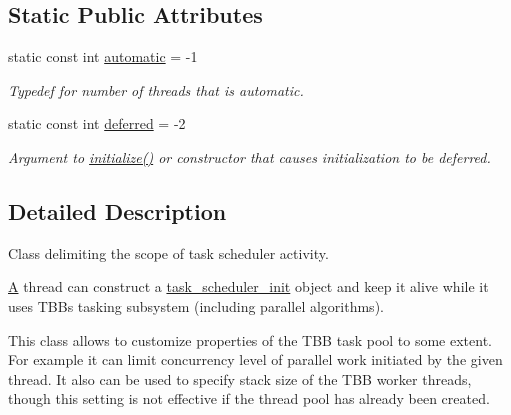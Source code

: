 \subsection*{Static Public Attributes}
\begin{DoxyCompactItemize}
\item 
\hypertarget{classtbb_1_1task__scheduler__init_a945886f5ef48300a8ebff2d077c166b1}{}static const int \hyperlink{classtbb_1_1task__scheduler__init_a945886f5ef48300a8ebff2d077c166b1}{automatic} = -\/1\label{classtbb_1_1task__scheduler__init_a945886f5ef48300a8ebff2d077c166b1}

\begin{DoxyCompactList}\small\item\em Typedef for number of threads that is automatic. \end{DoxyCompactList}\item 
\hypertarget{classtbb_1_1task__scheduler__init_af0e49ff2f59a4e53c9c07897b57f084d}{}static const int \hyperlink{classtbb_1_1task__scheduler__init_af0e49ff2f59a4e53c9c07897b57f084d}{deferred} = -\/2\label{classtbb_1_1task__scheduler__init_af0e49ff2f59a4e53c9c07897b57f084d}

\begin{DoxyCompactList}\small\item\em Argument to \hyperlink{classtbb_1_1task__scheduler__init_a22ca8b871fa96e8fed1d2336616662d9}{initialize()} or constructor that causes initialization to be deferred. \end{DoxyCompactList}\end{DoxyCompactItemize}


\subsection{Detailed Description}
Class delimiting the scope of task scheduler activity. 

\hyperlink{structA}{A} thread can construct a \hyperlink{classtbb_1_1task__scheduler__init}{task\+\_\+scheduler\+\_\+init} object and keep it alive while it uses T\+B\+B\textquotesingle{}s tasking subsystem (including parallel algorithms).

This class allows to customize properties of the T\+B\+B task pool to some extent. For example it can limit concurrency level of parallel work initiated by the given thread. It also can be used to specify stack size of the T\+B\+B worker threads, though this setting is not effective if the thread pool has already been created.

